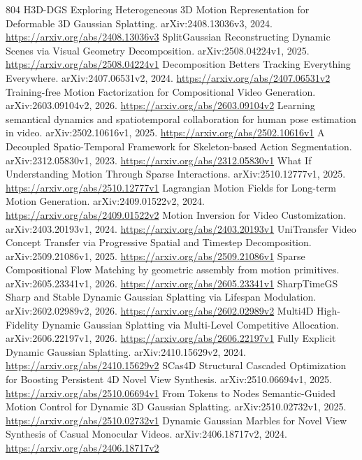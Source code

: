 \documentclass[11pt]{article}
\begin{document}
\begin{thebibliography}{804}
 H3D-DGS Exploring Heterogeneous 3D Motion Representation for Deformable 3D Gaussian Splatting. arXiv:2408.13036v3, 2024. \url{https://arxiv.org/abs/2408.13036v3}
 SplitGaussian Reconstructing Dynamic Scenes via Visual Geometry Decomposition. arXiv:2508.04224v1, 2025. \url{https://arxiv.org/abs/2508.04224v1}
 Decomposition Betters Tracking Everything Everywhere. arXiv:2407.06531v2, 2024. \url{https://arxiv.org/abs/2407.06531v2}
 Training-free Motion Factorization for Compositional Video Generation. arXiv:2603.09104v2, 2026. \url{https://arxiv.org/abs/2603.09104v2}
 Learning semantical dynamics and spatiotemporal collaboration for human pose estimation in video. arXiv:2502.10616v1, 2025. \url{https://arxiv.org/abs/2502.10616v1}
 A Decoupled Spatio-Temporal Framework for Skeleton-based Action Segmentation. arXiv:2312.05830v1, 2023. \url{https://arxiv.org/abs/2312.05830v1}
 What If Understanding Motion Through Sparse Interactions. arXiv:2510.12777v1, 2025. \url{https://arxiv.org/abs/2510.12777v1}
 Lagrangian Motion Fields for Long-term Motion Generation. arXiv:2409.01522v2, 2024. \url{https://arxiv.org/abs/2409.01522v2}
 Motion Inversion for Video Customization. arXiv:2403.20193v1, 2024. \url{https://arxiv.org/abs/2403.20193v1}
 UniTransfer Video Concept Transfer via Progressive Spatial and Timestep Decomposition. arXiv:2509.21086v1, 2025. \url{https://arxiv.org/abs/2509.21086v1}
 Sparse Compositional Flow Matching by geometric assembly from motion primitives. arXiv:2605.23341v1, 2026. \url{https://arxiv.org/abs/2605.23341v1}
 SharpTimeGS Sharp and Stable Dynamic Gaussian Splatting via Lifespan Modulation. arXiv:2602.02989v2, 2026. \url{https://arxiv.org/abs/2602.02989v2}
 Multi4D High-Fidelity Dynamic Gaussian Splatting via Multi-Level Competitive Allocation. arXiv:2606.22197v1, 2026. \url{https://arxiv.org/abs/2606.22197v1}
 Fully Explicit Dynamic Gaussian Splatting. arXiv:2410.15629v2, 2024. \url{https://arxiv.org/abs/2410.15629v2}
 SCas4D Structural Cascaded Optimization for Boosting Persistent 4D Novel View Synthesis. arXiv:2510.06694v1, 2025. \url{https://arxiv.org/abs/2510.06694v1}
 From Tokens to Nodes Semantic-Guided Motion Control for Dynamic 3D Gaussian Splatting. arXiv:2510.02732v1, 2025. \url{https://arxiv.org/abs/2510.02732v1}
 Dynamic Gaussian Marbles for Novel View Synthesis of Casual Monocular Videos. arXiv:2406.18717v2, 2024. \url{https://arxiv.org/abs/2406.18717v2}

\end{thebibliography}
\end{document}
